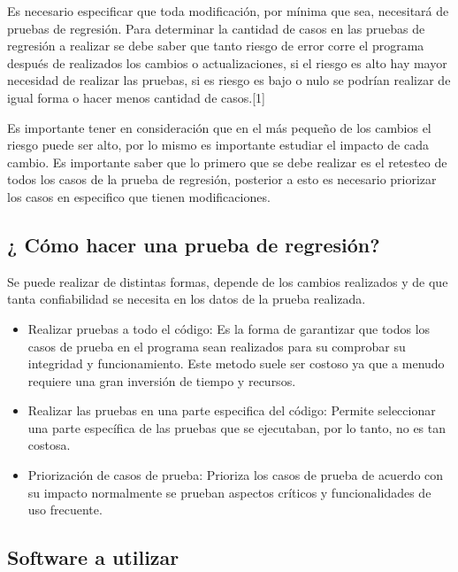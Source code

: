 \documentclass[conference]{IEEEtran}
\begin{document}
Es necesario especificar que toda modificación, por mínima que sea, necesitará de pruebas de regresión. 
Para determinar la cantidad de casos en las pruebas de regresión a realizar se debe saber que tanto riesgo de error corre el programa después de realizados los cambios o actualizaciones, si el riesgo es alto hay mayor necesidad de realizar las pruebas, si es riesgo es bajo o nulo se podrían realizar de igual forma o hacer menos cantidad de casos.[1]

Es importante tener en consideración que en el más pequeño de los cambios el riesgo puede ser alto, por lo mismo es importante estudiar el impacto de cada cambio. Es importante saber que lo primero que se debe realizar es el retesteo de todos los casos de la prueba de regresión, posterior a esto es necesario priorizar los casos en especifico que tienen modificaciones.


\subsection{¿ Cómo hacer una prueba de regresión?}

Se puede realizar de distintas formas, depende de los cambios realizados y de que tanta confiabilidad se necesita en los datos de la prueba realizada.

\begin{itemize}

\item Realizar pruebas a todo el código: Es la forma de garantizar que todos los casos de prueba en el programa sean realizados para su comprobar su integridad y funcionamiento. Este metodo suele ser costoso ya que a menudo requiere una gran inversión de tiempo y recursos.


\item Realizar las pruebas en una parte especifica del código:   
Permite seleccionar una parte específica de las pruebas que se ejecutaban, por lo tanto, no es tan costosa.

\item Priorización de casos de prueba: Prioriza los casos de prueba de acuerdo con su impacto normalmente se prueban aspectos críticos y funcionalidades de uso frecuente.

\end{itemize}


\subsection{Software a utilizar}
\end{document}
